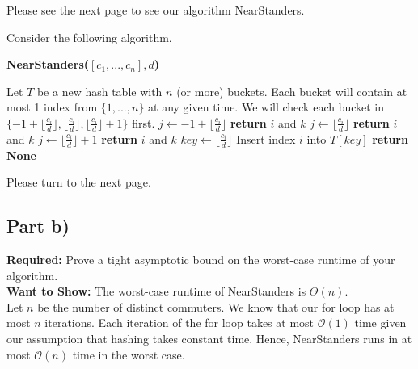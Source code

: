 \documentclass[12pt]{article}
\begin{document}
Please see the next page to see our algorithm NearStanders. 

\newpage

Consider the following algorithm. 

\begin{algorithm}[hbt!]
\caption{\textbf{NearStanders($[c_1,...,c_n], d$)}}\label{alg:cap}

\begin{algorithmic}[1]
\State Let $T$ be a new hash table with $n$ (or more) buckets. Each bucket will contain at most 1 index from $\{1,...,n\}$ at any given time.
\State
{}
    \State We will check each bucket in $\{-1 + \lfloor \frac{c_i}{d} \rfloor, \lfloor \frac{c_i}{d} \rfloor, \lfloor \frac{c_i}{d} \rfloor + 1\}$ first.
    \State
    \State $j \gets -1 + \lfloor \frac{c_i}{d} \rfloor$
            \State \textbf{return} $i$ and $k$
        \EndIf
    \EndIf
    \State
    \State $j \gets \lfloor \frac{c_i}{d} \rfloor$
            \State \textbf{return} $i$ and $k$
        \EndIf
    \EndIf
    \State
    \State $j \gets \lfloor \frac{c_i}{d} \rfloor + 1$
            \State \textbf{return} $i$ and $k$
        \EndIf
    \EndIf
    \State
    \State $key \gets \lfloor \frac{c_i}{d} \rfloor$
    \State Insert index $i$ into $T[key]$ 
\EndFor
\State \textbf{return None} 
\end{algorithmic}
\end{algorithm}

Please turn to the next page. 

\newpage

\subsection*{Part b)}

\textbf{Required:} Prove a tight asymptotic bound on the worst-case runtime of your algorithm. \\

\textbf{Want to Show:} The worst-case runtime of NearStanders is $\Theta(n)$. \\

Let $n$ be the number of distinct commuters. We know that our for loop has at most $n$ iterations. Each iteration of the for loop takes at most $\mathcal{O}(1)$ time given our assumption that hashing takes constant time. Hence, NearStanders runs in at most $\mathcal{O}(n)$ time in the worst case. \\
\end{document}
